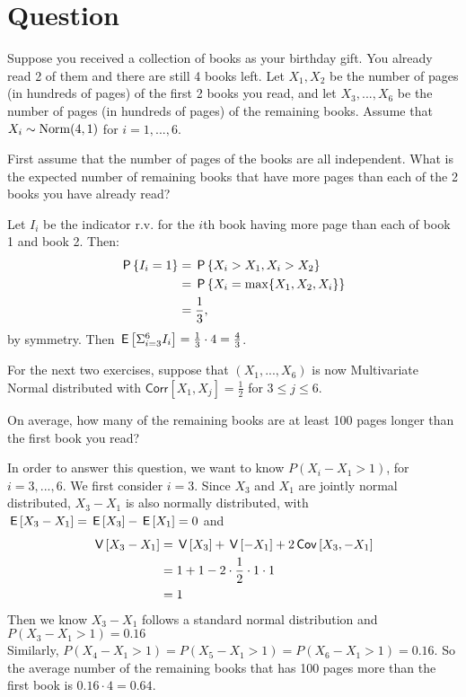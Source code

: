 \section{Question}


Suppose you received a collection of books as your birthday gift. You already read 2 of them and there are still 4 books left. Let $X_1, X_2$ be the number of pages (in hundreds of pages) of the first 2 books you read, and let $X_3, ..., X_6$ be the number of pages (in hundreds of pages) of the remaining books. Assume that $X_i\sim \Norm{4, 1}$ for $i=1,...,6$. 


\begin{exercise}[1.5]
 First assume that the number of pages of the books are all independent. What is the expected number of remaining books that have more pages than each of the 2 books you have already read?
\begin{solution}
Let $I_i$ be the indicator r.v. for the $i$th book having more page than each of book 1 and book 2. Then:
    \begin{align*}
        \P{I_i=1}&=\P{X_i>X_1, X_i>X_2}\\
        &=\P{X_i = \max\{X_1, X_2, X_i\}} \\
        &=\frac13,
    \end{align*}
    by symmetry.
    Then $\E{\Sigma_{i=3}^{6}I_i}=\frac{1}{3}\cdot 4=\frac43$.
\end{solution}
\end{exercise}


For the next two exercises, suppose that $(X_1,...,X_6)$ is now Multivariate Normal distributed with $\mathsf{Corr}\left[X_1,X_j\right]=\frac{1}{2}$ for $3 \leq j\leq 6$.

\begin{exercise}[2.5]
 On average, how many of the remaining books are at least 100 pages longer than the first book you read? 
\begin{solution}
  In order to answer this question, we want to know $P(X_i-X_1>1)$, for $i=3,...,6$.
   We first consider $i=3$. Since $X_3$ and $X_1$ are jointly normal distributed, $X_3-X_1$ is also normally distributed, with $\E{X_3-X_1}=\E{X_3}-\E{X_1}=0$ and 
    \begin{align*}
        \V{X_3-X_1}&=\V{X_3}+\V{-X_1}+2\cov{X_3,-X_1}\\
        &=1+1-2\cdot\frac{1}{2}\cdot 1\cdot 1\\
        &=1
    \end{align*}
    Then we know $X_3-X_1$ follows a standard normal distribution and $P(X_3-X_1>1)=0.16$\\
    Similarly,  $P(X_4-X_1>1)=P(X_5-X_1>1)=P(X_6-X_1>1)=0.16$. So the average number of the remaining books that has 100 pages more than the first book is $0.16\cdot4=0.64.$
\end{solution}
\end{exercise}


